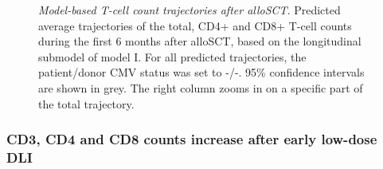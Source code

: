 \documentclass[
  letterpaper,
  DIV=11,
  numbers=noendperiod]{scrreprt}
\begin{document}
\begin{figure}


\caption{\label{fig-DLI-three}\emph{Model-based T-cell count
trajectories after alloSCT}. Predicted average trajectories of the
total, CD4+ and CD8+ T-cell counts during the first 6 months after
alloSCT, based on the longitudinal submodel of model I. For all
predicted trajectories, the patient/donor CMV status was set to -/-.
95\% confidence intervals are shown in grey. The right column zooms in
on a specific part of the total trajectory.}

\end{figure}%

\subsubsection{CD3, CD4 and CD8 counts increase after early low-dose
DLI}\label{cd3-cd4-and-cd8-counts-increase-after-early-low-dose-dli}
\end{document}
